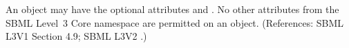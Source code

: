 An \AlgebraicRule object may have the optional attributes  
and .  No other attributes from the SBML Level~3 Core
namespace are permitted on an \AlgebraicRule object.  (References: SBML L3V1 Section 4.9; SBML
L3V2 .)
